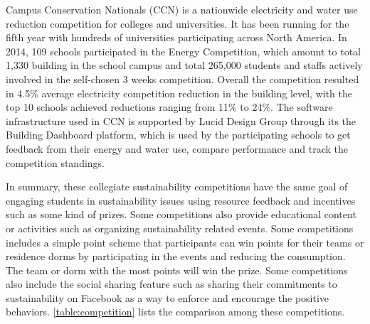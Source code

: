 Campus Conservation Nationals (CCN) \cite{competetoreduce} is a nationwide electricity and water use reduction competition for colleges and universities. It has been running for the fifth year with hundreds of universities participating across North America. In 2014, 109 schools participated in the Energy Competition, which amount to total 1,330 building in the school campus and total 265,000 students and staffs actively involved in the self-chosen 3 weeks competition. Overall the competition resulted in 4.5\% average electricity competition reduction in the building level, with the top 10 schools achieved reductions ranging from 11\% to 24\%. The software infrastructure used in CCN is supported by Lucid Design Group through its the Building Dashboard platform, which is used by the participating schools to get feedback from their energy and water use, compare performance and track the competition standings.

In summary, these collegiate sustainability competitions have the same goal of engaging students in sustainability issues using resource feedback and incentives such as some kind of prizes. Some competitions also provide educational content or activities such as organizing sustainability related events. Some competitions includes a simple point scheme that participants can win points for their teams or residence dorms by participating in the events and reducing the consumption. The team or dorm with the most points will win the prize. Some competitions also include the social sharing feature such as sharing their commitments to sustainability on Facebook as a way to enforce and encourage the positive behaviors.  \autoref{table:competition} lists the comparison among these competitions. 

